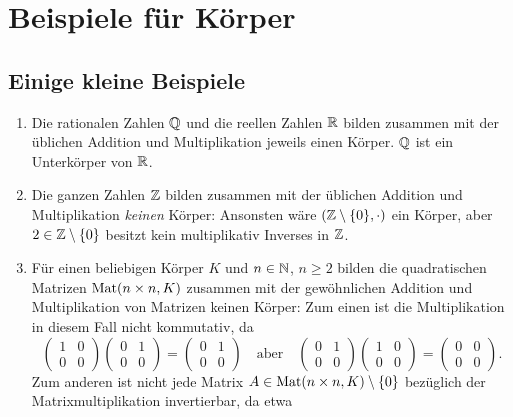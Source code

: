 \section{Beispiele für Körper}


\subsection{Einige kleine Beispiele}
\begin{enumerate}[leftmargin=*]
 \item
  Die rationalen Zahlen $\mathbb{Q}$ und die reellen Zahlen $\mathbb{R}$ bilden zusammen mit der üblichen Addition und Multiplikation jeweils einen Körper. $\mathbb{Q}$ ist ein Unterkörper von $\mathbb{R}$.
 \item
  Die ganzen Zahlen $\mathbb{Z}$ bilden zusammen mit der üblichen Addition und Multiplikation \emph{keinen} Körper: Ansonsten wäre $(\mathbb{Z}\setminus\{0\}, \cdot)$ ein Körper, aber $2 \in \mathbb{Z}\setminus\{0\}$ besitzt kein multiplikativ Inverses in $\mathbb{Z}$.
 \item
  Für einen beliebigen Körper $K$ und $n \in \mathbb{N}$, $n \geq 2$ bilden die quadratischen Matrizen $\mathrm{Mat}(n \times n, K)$ zusammen mit der gewöhnlichen Addition und Multiplikation von Matrizen keinen Körper: Zum einen ist die Multiplikation in diesem Fall nicht kommutativ, da
  \[
   \begin{pmatrix}
    1 & 0 \\
    0 & 0
   \end{pmatrix}
   \begin{pmatrix}
    0 & 1 \\
    0 & 0
   \end{pmatrix}
   =
   \begin{pmatrix}
    0 & 1 \\
    0 & 0
   \end{pmatrix}
   \quad\text{aber}\quad
   \begin{pmatrix}
    0 & 1 \\
    0 & 0
   \end{pmatrix}
   \begin{pmatrix}
    1 & 0 \\
    0 & 0
   \end{pmatrix}
   =
   \begin{pmatrix}
    0 & 0 \\
    0 & 0
   \end{pmatrix}.
  \]
  Zum anderen ist nicht jede Matrix $A \in \mathrm{Mat}(n \times n, K) \setminus \{0\}$ bezüglich der Matrixmultiplikation invertierbar, da etwa

\end{enumerate}
